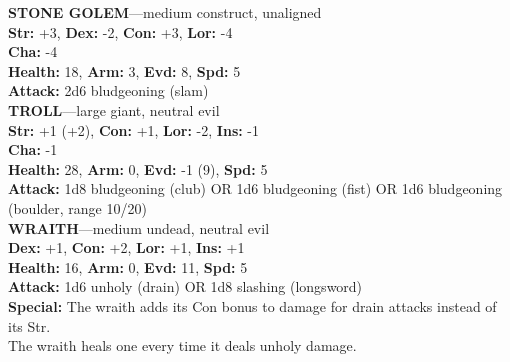 \documentclass[letterpaper, 12pt, twocolumn]{book}
\def\linedivide{, }
\def\sectionheader#1{\textbf{#1: }}
\begin{document}
\RaggedRight\textbf{STONE GOLEM}---medium construct, unaligned\\\sectionheader{Str}+3\linedivide\sectionheader{Dex}-2\linedivide\sectionheader{Con}+3\linedivide\sectionheader{Lor}-4\\\sectionheader{Cha}-4\\\sectionheader{Health}18\linedivide\sectionheader{Arm}3\linedivide\sectionheader{Evd}8\linedivide\sectionheader{Spd}5\\\sectionheader{Attack}2d6 bludgeoning (slam)\\\bigskip\textbf{TROLL}---large giant, neutral evil\\\sectionheader{Str}+1 (+2)\linedivide\sectionheader{Con}+1\linedivide\sectionheader{Lor}-2\linedivide\sectionheader{Ins}-1\\\sectionheader{Cha}-1\\\sectionheader{Health}28\linedivide\sectionheader{Arm}0\linedivide\sectionheader{Evd}-1 (9)\linedivide\sectionheader{Spd}5\\\sectionheader{Attack}1d8 bludgeoning (club) OR 1d6 bludgeoning (fist) OR 1d6 bludgeoning (boulder, range 10/20)\\\bigskip\textbf{WRAITH}---medium undead, neutral evil\\\sectionheader{Dex}+1\linedivide\sectionheader{Con}+2\linedivide\sectionheader{Lor}+1\linedivide\sectionheader{Ins}+1\\\sectionheader{Health}16\linedivide\sectionheader{Arm}0\linedivide\sectionheader{Evd}11\linedivide\sectionheader{Spd}5\\\sectionheader{Attack}1d6 unholy (drain) OR 1d8 slashing (longsword)\\\sectionheader{Special}The wraith adds its Con bonus to damage for drain attacks instead of its Str.\\The wraith heals one every time it deals unholy damage.\\\bigskip
\end{document}
